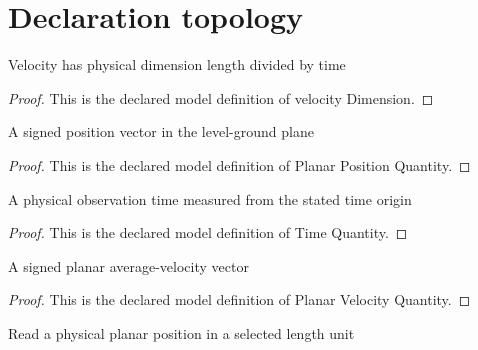 \section{Declaration topology}
\begin{definition}
  \label{def:physics:phyx-mini-0737:phyxminiproblems-problemphyxmini0737-velocitydimension}
  Velocity has physical dimension length divided by time
\end{definition}
\begin{proof}
  This is the declared model definition of velocity Dimension.
\end{proof}
\begin{definition}
  \label{def:physics:phyx-mini-0737:phyxminiproblems-problemphyxmini0737-planarpositionquantity}
  A signed position vector in the level-ground plane
\end{definition}
\begin{proof}
  This is the declared model definition of Planar Position Quantity.
\end{proof}
\begin{definition}
  \label{def:physics:phyx-mini-0737:phyxminiproblems-problemphyxmini0737-timequantity}
  A physical observation time measured from the stated time origin
\end{definition}
\begin{proof}
  This is the declared model definition of Time Quantity.
\end{proof}
\begin{definition}
  \label{def:physics:phyx-mini-0737:phyxminiproblems-problemphyxmini0737-planarvelocityquantity}
  A signed planar average-velocity vector
\end{definition}
\begin{proof}
  This is the declared model definition of Planar Velocity Quantity.
\end{proof}
\begin{definition}
  \label{def:physics:phyx-mini-0737:phyxminiproblems-problemphyxmini0737-positionreadout}
  Read a physical planar position in a selected length unit
\end{definition}

